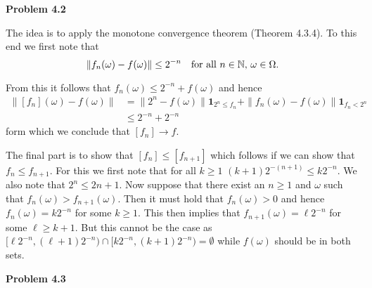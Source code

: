 
\textbf{Problem 4.2}

The idea is to apply the monotone convergence theorem (Theorem 4.3.4). To this end we first note that
\[
	\| f_n(\omega) - f(\omega) \| \le 2^{-n} \quad \text{for all } n \in \mathbb N, \, \omega \in \Omega.
\] 

From this it follows that $f_n(\omega) \le 2^{-n} + f(\omega)$ and hence
\begin{align*}
	\|[f_n](\omega) - f(\omega)\| 
	&= \|2^n - f(\omega)\| \mathbf{1}_{2^n \le f_n} + \|f_n(\omega) - f(\omega)\|\mathbf{1}_{f_n < 2^n}\\
	&\le 2^{-n} + 2^{-n}
\end{align*}
form which we conclude that $[f_n] \to f$.

The final part is to show that $[f_n] \le [f_{n+1}]$ which follows if we can show that $f_n \le f_{n+1}$. For this we first note that for all $k \ge 1$ $(k+1) 2^{-(n+1)} \le k 2^{-n}$. We also note that $2^{n} \le 2{n+1}$. Now suppose that there exist an $n \ge 1$ and $\omega$ such that $f_n(\omega) > f_{n + 1}(\omega)$. Then it must hold that $f_n(\omega) > 0$ and hence $f_n(\omega) = k 2^{-n}$ for some $k \ge 1$. This then implies that $f_{n+1}(\omega) = \ell 2^{-n}$ for some $\ell \ge k+1$. But this cannot be the case as $[\ell 2^{-n}, (\ell+1)2^{-n}) \cap [k 2^{-n}, (k+1)2^{-n}) = \emptyset$ while $f(\omega)$ should be in both sets.


\bigskip
\textbf{Problem 4.3}

